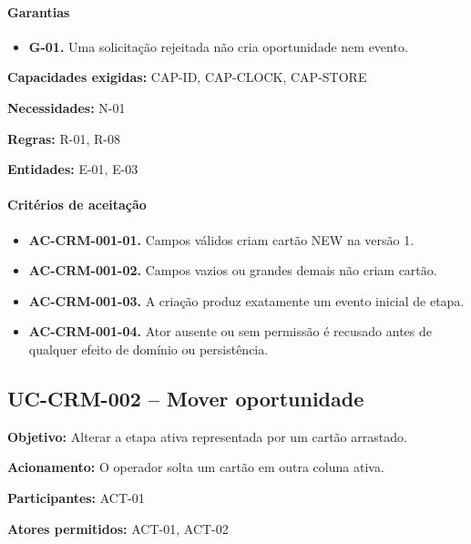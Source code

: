 \documentclass[10pt,a4paper]{article}
\begin{document}
\paragraph{Garantias}

\begin{itemize}

\item \textbf{G-01.} Uma solicitação rejeitada não cria oportunidade nem evento.

\end{itemize}

\textbf{Capacidades exigidas:} CAP-ID, CAP-CLOCK, CAP-STORE

\textbf{Necessidades:} N-01

\textbf{Regras:} R-01, R-08

\textbf{Entidades:} E-01, E-03

\paragraph{Critérios de aceitação}

\begin{itemize}

\item \textbf{AC-CRM-001-01.} Campos válidos criam cartão NEW na versão 1.

\item \textbf{AC-CRM-001-02.} Campos vazios ou grandes demais não criam cartão.

\item \textbf{AC-CRM-001-03.} A criação produz exatamente um evento inicial de etapa.

\item \textbf{AC-CRM-001-04.} Ator ausente ou sem permissão é recusado antes de qualquer efeito de domínio ou persistência.

\end{itemize}

\subsection{UC-CRM-002 -- Mover oportunidade}

\textbf{Objetivo:} Alterar a etapa ativa representada por um cartão arrastado.

\textbf{Acionamento:} O operador solta um cartão em outra coluna ativa.

\textbf{Participantes:} ACT-01

\textbf{Atores permitidos:} ACT-01, ACT-02
\end{document}

